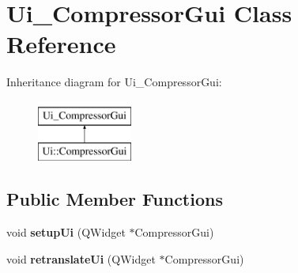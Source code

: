 \hypertarget{class_ui___compressor_gui}{}\section{Ui\+\_\+\+Compressor\+Gui Class Reference}
\label{class_ui___compressor_gui}
Inheritance diagram for Ui\+\_\+\+Compressor\+Gui\+:\begin{figure}[H]
\begin{center}
\leavevmode
\includegraphics[height=2.000000cm]{class_ui___compressor_gui}
\end{center}
\end{figure}
\subsection*{Public Member Functions}
\begin{DoxyCompactItemize}
\item 
\mbox{\label{class_ui___compressor_gui_ac98d2e01425cf1d961ac7ecf4aa99e6a}} 
void {\bfseries setup\+Ui} (Q\+Widget $\ast$Compressor\+Gui)
\item 
\mbox{\label{class_ui___compressor_gui_a369a8bf41fb61e941a2fe11f75dd1f0b}} 
void {\bfseries retranslate\+Ui} (Q\+Widget $\ast$Compressor\+Gui)
\end{DoxyCompactItemize}
